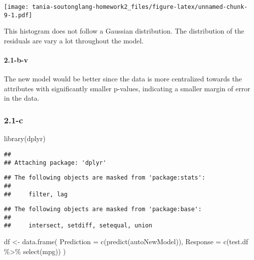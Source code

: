 \documentclass[
]{article}
\newenvironment{Shaded}{\begin{snugshade}}{\end{snugshade}}
\newcommand{\AttributeTok}[1]{\textcolor[rgb]{0.77,0.63,0.00}{#1}}
\newcommand{\FunctionTok}[1]{\textcolor[rgb]{0.00,0.00,0.00}{#1}}
\newcommand{\NormalTok}[1]{#1}
\newcommand{\OtherTok}[1]{\textcolor[rgb]{0.56,0.35,0.01}{#1}}
\newcommand{\SpecialCharTok}[1]{\textcolor[rgb]{0.00,0.00,0.00}{#1}}
\begin{document}
\texttt{[image: tania-soutonglang-homework2\_files/figure-latex/unnamed-chunk-9-1.pdf]}

This histogram does not follow a Gaussian distribution. The distribution
of the residuals are vary a lot throughout the model.

\hypertarget{b-v}{%
\paragraph{2.1-b-v}\label{b-v}}

The new model would be better since the data is more centralized towards
the attributes with significantly smaller p-values, indicating a smaller
margin of error in the data.

\hypertarget{c}{%
\subsubsection{2.1-c}\label{c}}

\begin{Shaded}
\begin{Highlighting}[]
\FunctionTok{library}\NormalTok{(dplyr)}
\end{Highlighting}
\end{Shaded}

\begin{verbatim}
## 
## Attaching package: 'dplyr'
\end{verbatim}

\begin{verbatim}
## The following objects are masked from 'package:stats':
## 
##     filter, lag
\end{verbatim}

\begin{verbatim}
## The following objects are masked from 'package:base':
## 
##     intersect, setdiff, setequal, union
\end{verbatim}

\begin{Shaded}
\begin{Highlighting}[]
\NormalTok{df }\OtherTok{\textless{}{-}} \FunctionTok{data.frame}\NormalTok{(}
  \AttributeTok{Prediction =} \FunctionTok{c}\NormalTok{(}\FunctionTok{predict}\NormalTok{(autoNewModel)),}
  \AttributeTok{Response =} \FunctionTok{c}\NormalTok{(test.df }\SpecialCharTok{\%\textgreater{}\%} \FunctionTok{select}\NormalTok{(mpg))}
\NormalTok{)}
\end{Highlighting}
\end{Shaded}
\end{document}
